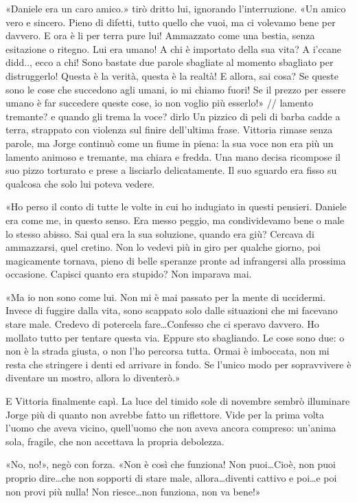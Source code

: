 «Daniele era un caro amico.» tirò dritto lui, ignorando l'interruzione. «Un amico vero e sincero. Pieno di difetti, tutto quello che vuoi, ma ci volevamo bene per davvero. E ora è li per terra pure lui! Ammazzato come una bestia, senza esitazione o ritegno. Lui era umano! A chi è importato della sua vita? A i'ccane didd.., ecco a chi! Sono bastate due parole sbagliate al momento sbagliato per distruggerlo! Questa è la verità, questa è la realtà! E allora, sai cosa? Se queste sono le cose che succedono agli umani, io mi chiamo fuori! Se il prezzo per essere umano è far succedere queste cose, io non voglio più esserlo!»
// lamento tremante? e quando gli trema la voce? dirlo
Un pizzico di peli di barba cadde a terra, strappato con violenza sul finire dell'ultima frase. Vittoria rimase senza parole, ma Jorge continuò come un fiume in piena: la sua voce non era più un lamento animoso e tremante, ma chiara e fredda. Una mano decisa ricompose il suo pizzo torturato e prese a lisciarlo delicatamente. Il suo sguardo era fisso su qualcosa che solo lui poteva vedere.

«Ho perso il conto di tutte le volte in cui ho indugiato in questi pensieri. Daniele era come me, in questo senso. Era messo peggio, ma condividevamo bene o male lo stesso abisso. Sai qual era la sua soluzione, quando era giù? Cercava di ammazzarsi, quel cretino. Non lo vedevi più in giro per qualche giorno, poi magicamente tornava, pieno di belle speranze pronte ad infrangersi alla prossima occasione. Capisci quanto era stupido? Non imparava mai.

«Ma io non sono come lui. Non mi è mai passato per la mente di uccidermi. Invece di fuggire dalla vita, sono scappato solo dalle situazioni che mi facevano stare male. Credevo di potercela fare\ldots Confesso che ci speravo davvero. Ho mollato tutto per tentare questa via. Eppure sto sbagliando. Le cose sono due: o non è la strada giusta, o non l'ho percorsa tutta. Ormai è imboccata, non mi resta che stringere i denti ed arrivare in fondo. Se l'unico modo per sopravvivere è diventare un mostro, allora lo diventerò.»

E Vittoria finalmente capì. La luce del timido sole di novembre sembrò illuminare Jorge più di quanto non avrebbe fatto un riflettore. Vide per la prima volta l'uomo che aveva vicino, quell'uomo che non aveva ancora compreso: un'anima sola, fragile, che non accettava la propria debolezza.

«No, no!», negò con forza. «Non è così che funziona! Non puoi\ldots Cioè, non puoi proprio dire\ldots che non sopporti di stare male, allora\ldots diventi cattivo e poi\ldots e poi non provi più nulla! Non riesce\ldots non funziona, non va bene!»

